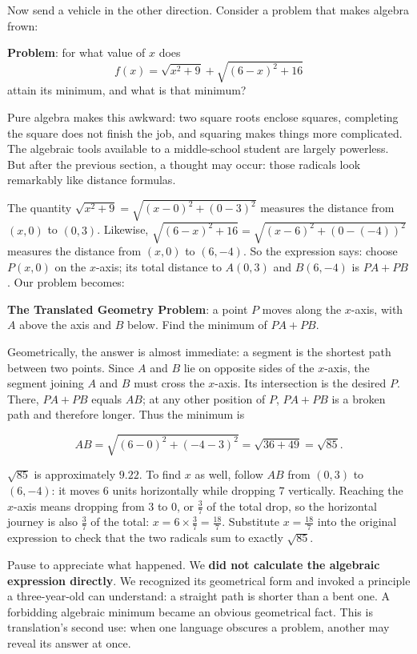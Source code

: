 Now send a vehicle in the other direction. Consider a problem that makes algebra frown:

\textbf{Problem}: for what value of $x$ does
\[
f(x)=\sqrt{x^{2}+9}+\sqrt{(6-x)^{2}+16}
\]
attain its minimum, and what is that minimum?

Pure algebra makes this awkward: two square roots enclose squares, completing the square does not finish the job, and squaring makes things more complicated. The algebraic tools available to a middle-school student are largely powerless. But after the previous section, a thought may occur: those radicals look remarkably like distance formulas.

The quantity $\sqrt{x^{2}+9}=\sqrt{(x-0)^{2}+(0-3)^{2}}$ measures the distance from $(x,0)$ to $(0,3)$. Likewise, $\sqrt{(6-x)^{2}+16}=\sqrt{(x-6)^{2}+(0-(-4))^{2}}$ measures the distance from $(x,0)$ to $(6,-4)$. So the expression says: choose $P(x,0)$ on the $x$-axis; its total distance to $A(0,3)$ and $B(6,-4)$ is $PA+PB$. Our problem becomes:

\textbf{The Translated Geometry Problem}: a point $P$ moves along the $x$-axis, with $A$ above the axis and $B$ below. Find the minimum of $PA+PB$.

Geometrically, the answer is almost immediate: a segment is the shortest path between two points. Since $A$ and $B$ lie on opposite sides of the $x$-axis, the segment joining $A$ and $B$ must cross the $x$-axis. Its intersection is the desired $P$. There, $PA+PB$ equals $AB$; at any other position of $P$, $PA+PB$ is a broken path and therefore longer. Thus the minimum is

\[
AB=\sqrt{(6-0)^{2}+(-4-3)^{2}}=\sqrt{36+49}=\sqrt{85}.
\]

$\sqrt{85}$ is approximately $9.22$. To find $x$ as well, follow $AB$ from $(0,3)$ to $(6,-4)$: it moves $6$ units horizontally while dropping $7$ vertically. Reaching the $x$-axis means dropping from $3$ to $0$, or $\frac{3}{7}$ of the total drop, so the horizontal journey is also $\frac{3}{7}$ of the total: $x=6\times\frac{3}{7}=\frac{18}{7}$. Substitute $x=\frac{18}{7}$ into the original expression to check that the two radicals sum to exactly $\sqrt{85}$.

Pause to appreciate what happened. We \textbf{did not calculate the algebraic expression directly}. We recognized its geometrical form and invoked a principle a three-year-old can understand: a straight path is shorter than a bent one. A forbidding algebraic minimum became an obvious geometrical fact. This is translation's second use: when one language obscures a problem, another may reveal its answer at once.

